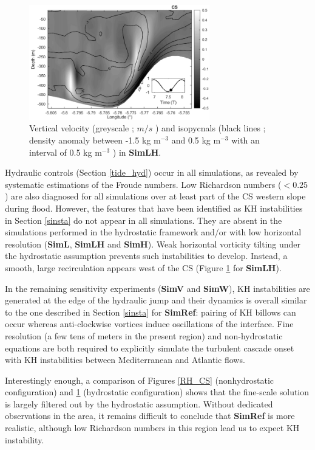 \begin{figure}[!h]
\centering
  \includegraphics[width=0.7\textwidth]{./GBR2D/figure11.png}
  \caption {Vertical velocity (greyscale ; $m/s$ ) and isopycnals (black lines ; density anomaly between -1.5 kg m$^{-3}$ and 0.5 kg m$^{-3}$ with an interval of 0.5 kg m$^{-3}$ ) in \textbf{SimLH}.}
	\label{fig_sensnum1}
\end{figure}

Hydraulic controls (Section \ref{tide_hyd}) occur in all simulations, as revealed by systematic estimations of the Froude numbers. Low Richardson numbers ($<0.25$) are also diagnosed for all simulations over at least part of the CS western slope during flood. However, the features that have been identified as KH instabilities in Section \ref{sinsta} do not appear in all simulations. They are absent in the simulations performed in the hydrostatic framework and/or with low horizontal resolution (\textbf{SimL}, \textbf{SimLH} and \textbf{SimH}). Weak horizontal vorticity tilting under the hydrostatic assumption prevents such instabilities to develop. Instead, a smooth, large recirculation  appears west of the CS (Figure \ref{fig_sensnum1} for \textbf{SimLH}).

In the remaining sensitivity experiments (\textbf{SimV} and \textbf{SimW}), KH instabilities are generated at the edge of the hydraulic jump and their dynamics is overall similar to the one described in Section \ref{sinsta} for \textbf{SimRef}: pairing of KH billows can occur whereas anti-clockwise vortices induce oscillations of the interface. 
Fine resolution (a few tens of meters in the present region) and non-hydrostatic equations are both required to explicitly simulate the turbulent cascade onset with KH instabilities between Mediterranean and Atlantic flows. 

Interestingly enough, a comparison of Figures \ref{RH_CS} (nonhydrostatic configuration) and \ref{fig_sensnum1} (hydrostatic configuration) shows that the fine-scale solution is largely filtered out by the hydrostatic assumption. Without dedicated observations in the area, it remains difficult to conclude that \textbf{SimRef} is more realistic, although low Richardson numbers in this region lead us to expect KH instability.

